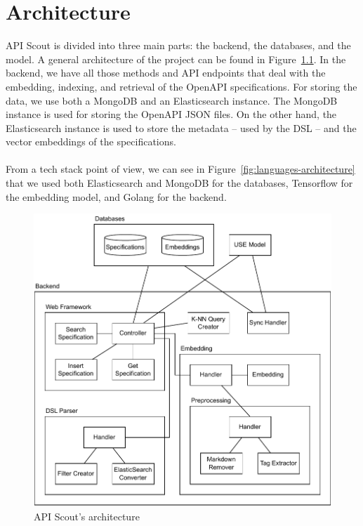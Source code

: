 \chapter{Architecture}\label{ch:architecture}
API Scout is divided into three main parts: the backend, the databases, and the model.
A general architecture of the project can be found in Figure~\ref{fig:backend-architecture}.
In the backend, we have all those methods and API endpoints that deal with the embedding, indexing, and retrieval of the OpenAPI specifications.
For storing the data, we use both a MongoDB and an Elasticsearch instance.
The MongoDB instance is used for storing the OpenAPI JSON files.
On the other hand, the Elasticsearch instance is used to store the metadata -- used by the DSL -- and the vector embeddings of the specifications. \\ \\
From a tech stack point of view, we can see in Figure~\ref{fig:languages-architecture} that we used both Elasticsearch and MongoDB for the databases, Tensorflow for the embedding model, and Golang for the backend.

\begin{figure}[h]
    \begin{center}
        \includegraphics[width=0.6\linewidth]{assets/pdf/architecture/general-architecture}
    \end{center}

    \caption{API Scout's architecture}
    \label{fig:backend-architecture}
\end{figure}

